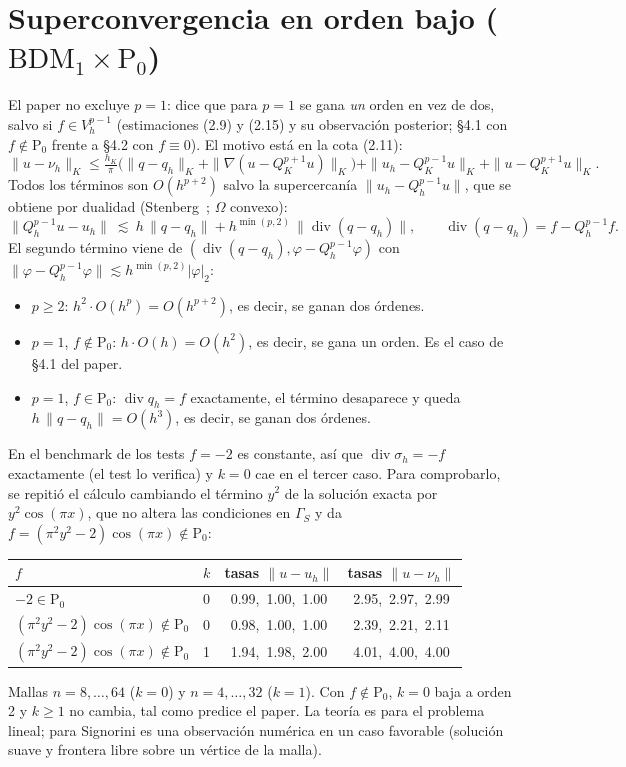 \documentclass[11pt,a4paper]{article}
\newcommand{\BDM}{\mathrm{BDM}}
\newcommand{\Pk}[1]{\mathrm{P}_{#1}}
\newcommand{\dive}{\operatorname{div}}
\begin{document}
\section{Superconvergencia en orden bajo ($\BDM_1\times\Pk0$)}

El paper no excluye $p=1$: dice que para $p=1$ se gana \emph{un} orden en vez de dos, salvo si
$f\in V_h^{p-1}$ (estimaciones (2.9) y (2.15) y su observación posterior; §4.1 con $f\notin\Pk0$
frente a §4.2 con $f\equiv0$). El motivo está en la cota (2.11):
\[
  \|u-\nu_h\|_K \le \tfrac{h_K}{\pi}\bigl(\|q-q_h\|_K+\|\nabla(u-Q^{p+1}_Ku)\|_K\bigr)
  +\|u_h-Q^{p-1}_Ku\|_K+\|u-Q^{p+1}_Ku\|_K .
\]
Todos los términos son $O(h^{p+2})$ salvo la supercercanía $\|u_h-Q^{p-1}_hu\|$, que se obtiene
por dualidad (Stenberg~\cite{stenberg}; $\Omega$ convexo):
\[
  \|Q^{p-1}_hu-u_h\|\ \lesssim\ h\,\|q-q_h\| + h^{\min(p,2)}\,\|\dive(q-q_h)\|,
  \qquad \dive(q-q_h)=f-Q^{p-1}_hf .
\]
El segundo término viene de $(\dive(q-q_h),\varphi-Q^{p-1}_h\varphi)$ con
$\|\varphi-Q^{p-1}_h\varphi\|\lesssim h^{\min(p,2)}|\varphi|_2$:
\begin{itemize}
  \item $p\ge2$: $h^2\cdot O(h^{p})=O(h^{p+2})$, es decir, se ganan dos órdenes.
  \item $p=1$, $f\notin\Pk0$: $h\cdot O(h)=O(h^2)$, es decir, se gana un orden. Es el caso de
        §4.1 del paper.
  \item $p=1$, $f\in\Pk0$: $\dive q_h=f$ exactamente, el término desaparece y queda
        $h\,\|q-q_h\|=O(h^3)$, es decir, se ganan dos órdenes.
\end{itemize}
En el benchmark de los tests $f=-2$ es constante, así que $\dive\sigma_h=-f$ exactamente (el
test lo verifica) y $k=0$ cae en el tercer caso. Para comprobarlo, se repitió el cálculo
cambiando el término $y^2$ de la solución exacta por $y^2\cos(\pi x)$, que no altera las
condiciones en $\Gamma_S$ y da $f=(\pi^2y^2-2)\cos(\pi x)\notin\Pk0$:

\begin{center}
\begin{tabular}{@{}llcc@{}}
\toprule
$f$ & $k$ & tasas $\|u-u_h\|$ & tasas $\|u-\nu_h\|$ \\
\midrule
$-2\in\Pk0$                          & 0 & 0.99,\ 1.00,\ 1.00 & 2.95,\ 2.97,\ 2.99 \\
$(\pi^2y^2-2)\cos(\pi x)\notin\Pk0$  & 0 & 0.98,\ 1.00,\ 1.00 & 2.39,\ 2.21,\ 2.11 \\
$(\pi^2y^2-2)\cos(\pi x)\notin\Pk0$  & 1 & 1.94,\ 1.98,\ 2.00 & 4.01,\ 4.00,\ 4.00 \\
\bottomrule
\end{tabular}
\end{center}
\noindent Mallas $n=8,\dots,64$ ($k=0$) y $n=4,\dots,32$ ($k=1$). Con $f\notin\Pk0$, $k=0$ baja a
orden 2 y $k\ge1$ no cambia, tal como predice el paper. La teoría es para el problema lineal;
para Signorini es una observación numérica en un caso favorable (solución suave y frontera
libre sobre un vértice de la malla).
\end{document}
